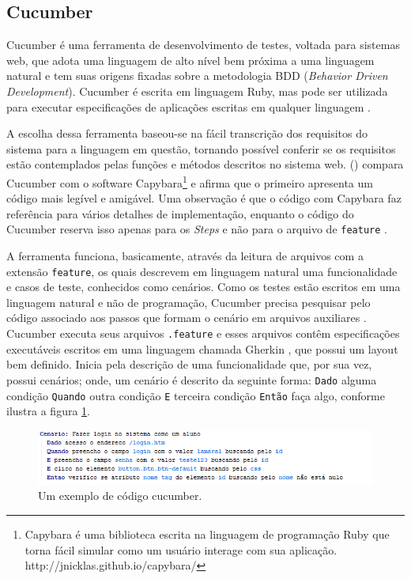 \documentclass[tg]{mdtufsm}
\begin{document}
\subsection{Cucumber}
Cucumber é uma ferramenta de desenvolvimento de testes, voltada para sistemas web, que adota uma linguagem de alto nível bem próxima a uma linguagem natural e tem suas origens fixadas sobre a metodologia BDD (\emph{Behavior Driven Development}). Cucumber
é escrita em linguagem Ruby, mas pode ser utilizada para executar especificações de aplicações escritas em qualquer linguagem \cite{nunescucumber}.

A escolha dessa ferramenta baseou-se na fácil transcrição dos requisitos do sistema para a linguagem em questão, tornando possível conferir se os requisitos estão contemplados pelas funções e métodos descritos no sistema web.
\citeauthor{lopescucumbervalor} (\citeyear{lopescucumbervalor}) compara Cucumber com o software Capybara\footnote{Capybara é uma biblioteca escrita na linguagem de programação Ruby que torna fácil simular como um usuário interage com sua aplicação. http://jnicklas.github.io/capybara/} e afirma que o primeiro apresenta um código mais legível e amigável. Uma observação é que o código com Capybara faz
referência para vários detalhes de implementação, enquanto o código do Cucumber reserva isso apenas para os \emph{Steps} e não para o arquivo de \texttt{feature} \cite{lopescucumbervalor}.

A ferramenta funciona, basicamente, através da leitura de arquivos com a extensão \texttt{feature}, os quais descrevem em linguagem natural uma funcionalidade e casos de teste, conhecidos como cenários.
Como os testes estão escritos em uma linguagem natural e não de programação, Cucumber precisa pesquisar pelo código associado aos passos que formam o cenário em arquivos auxiliares \cite{scmitzcucumberreview}. Cucumber
executa seus arquivos \texttt{.feature} e esses arquivos contêm especificações executáveis escritos em uma linguagem chamada Gherkin \cite{cucumberwiki}, que possui um layout bem definido. Inicia pela descrição de uma funcionalidade
que, por sua vez, possui cenários; onde, um cenário é descrito da seguinte forma: \texttt{Dado} alguma condição \texttt{Quando} outra condição \texttt{E} terceira condição \texttt{Então} faça algo, conforme ilustra a figura \ref{fig:codigo_cucumber}.

\begin{figure}[!htb]
	\centering
	\includegraphics[width=1.1
	\textwidth]{codigo_cucumber}
	\caption{Um exemplo de código cucumber.}
	\label{fig:codigo_cucumber}
\end{figure}
\end{document}
